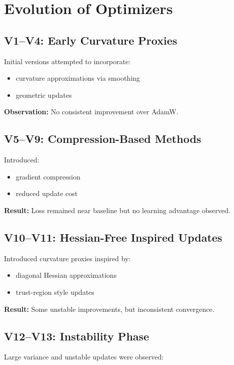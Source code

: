 \documentclass{article}
\begin{document}
\section{Evolution of Optimizers}

\subsection{V1–V4: Early Curvature Proxies}

Initial versions attempted to incorporate:
\begin{itemize}
    \item curvature approximations via smoothing
    \item geometric updates
\end{itemize}

\textbf{Observation:}
No consistent improvement over AdamW.

\subsection{V5–V9: Compression-Based Methods}

Introduced:
\begin{itemize}
    \item gradient compression
    \item reduced update cost
\end{itemize}

\textbf{Result:}
Loss remained near baseline but no learning advantage observed.

\subsection{V10–V11: Hessian-Free Inspired Updates}

Introduced curvature proxies inspired by:
\begin{itemize}
    \item diagonal Hessian approximations
    \item trust-region style updates
\end{itemize}

\textbf{Result:}
Some unstable improvements, but inconsistent convergence.

\subsection{V12–V13: Instability Phase}

Large variance and unstable updates were observed:
\end{document}
